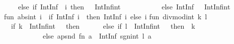 \begin{isabellebody}
\begin{isamarkuptext}
\ \ \ \ else\ {}if\ IntInf{}{}\ {}{}{}\ i{}\ then\ {}{}\ {}\ IntInf{}int{}\isanewline
\ \ \ \ \ \ \ \ \ \ \ else\ IntInf{}{}\ {}{}\ {}\ IntInf{}int{}{}{}{}\isanewline
\isanewline
fun\ abs{}int\ i\ {}\ {}if\ IntInf{}{}\ {}i{}\ {}{}\ then\ IntInf{}{}\ i\ else\ i{}{}\isanewline
\isanewline
fun\ divmod{}int\ k\ l\ {}\isanewline
\ \ {}if\ {}{}k\ {}\ IntInf{}int{}\ {}\ {}{}\ then\ {}{}{}\ {}{}\isanewline
\ \ \ \ else\ {}if\ {}{}l\ {}\ IntInf{}int{}\ {}\ {}{}\ then\ {}{}{}\ k{}\isanewline
\ \ \ \ \ \ \ \ \ \ \ else\ apsnd\ {}fn\ a\ {}{}\ IntInf{}{}\ {}sgn{}int\ l{}\ a{}{}\isanewline

\end{isamarkuptext}
\end{isabellebody}
